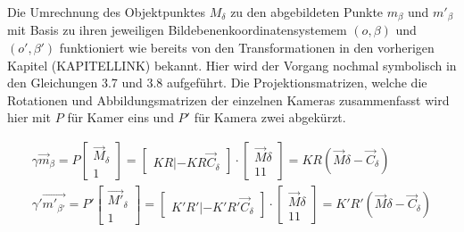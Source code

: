 Die Umrechnung des Objektpunktes $M_\delta$ zu den abgebildeten Punkte $m_\beta$ und $m'_\beta$ mit Basis zu ihren jeweiligen Bildebenenkoordinatensystemem $(o, \beta)$ und $(o',\beta')$ funktioniert wie bereits von den Transformationen in den vorherigen Kapitel (KAPITELLINK) bekannt. Hier wird der Vorgang nochmal symbolisch in den Gleichungen 3.7 und 3.8 aufgeführt. Die Projektionsmatrizen, welche die Rotationen und Abbildungsmatrizen der einzelnen Kameras zusammenfasst wird hier mit $P$ für Kamer eins  und $P'$ für Kamera zwei abgekürzt.\cite{Elements}

\begin{gather}
\gamma \vec{m}_\beta = P \begin{bmatrix}\vec{M}_\delta\\1\end{bmatrix} = 
\begin{bmatrix}KR|-KR\vec{C}_\delta\end{bmatrix}\cdot \begin{bmatrix}\vec{M}\delta\\11\end{bmatrix} = KR(\vec{M}\delta - \vec{C}_\delta)\\
\gamma' \vec{m'_{\beta'}} = P' \begin{bmatrix}\vec{M'}_\delta\\1\end{bmatrix} = 
\begin{bmatrix}K'R'|-K'R'\vec{C}_\delta\end{bmatrix}\cdot \begin{bmatrix}\vec{M}\delta\\11\end{bmatrix} = K'R'(\vec{M}\delta - \vec{C}_\delta)
\end{gather}
